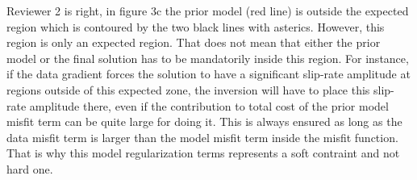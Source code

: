 \documentclass[10pt]{extarticle}
\begin{document}
\begin{Answer}
Reviewer 2 is right, in figure 3c the prior model (red line) is outside the expected region
which is contoured by the two black lines with asterics. However, this region is only an 
expected region. That does not mean that either the prior model or the final solution has 
to be mandatorily inside this region. For instance, if the data gradient forces the solution
to have a significant slip-rate amplitude at regions outside of this expected zone, the 
inversion will have to place this slip-rate amplitude there, even if the contribution to 
total cost of the prior model misfit term can be quite large for doing it. This is always 
ensured as long as the data misfit term is larger than the model misfit term inside the misfit 
function. That is why this model regularization terms represents a soft contraint and not 
hard one.
%
 \WorkInProgressRevTask
\end{Answer}
%
\end{document}
